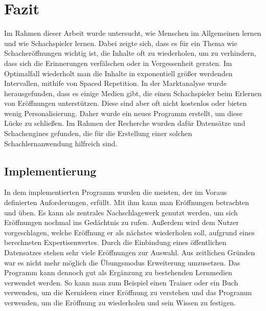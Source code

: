 
\chapter{Fazit}
Im Rahmen dieser Arbeit wurde untersucht, wie Menschen im Allgemeinen lernen und wie Schachspieler lernen. Dabei zeigte sich, dass es für ein Thema wie Schacheröffnungen wichtig ist, die Inhalte oft zu wiederholen, um zu verhindern, dass sich die Erinnerungen verfälschen oder in Vergessenheit geraten. Im Optimalfall wiederholt man die Inhalte in exponentiell größer werdenden Intervallen, mithife von Spaced Repetition. In der Marktanalyse wurde herausgefunden, dass es einige Medien gibt, die einen Schachspieler beim Erlernen von Eröffnungen unterstützen. Diese sind aber oft nicht kostenlos oder bieten wenig Personalisierung. Daher wurde ein neues Programm erstellt, um diese Lücke zu schließen. Im Rahmen der Recherche wurden dafür Datensätze und Schachengines gefunden, die für die Erstellung einer solchen Schachlernanwendung hilfreich sind.

\section{Implementierung}
In dem implementierten Programm wurden die meisten, der im Voraus definierten Anforderungen, erfüllt. Mit ihm kann man Eröffnungen betrachten und üben. Es kann als zentrales Nachschlagewerk genutzt werden, um sich Eröffnungen nochmal ins Gedächtnis zu rufen. Außerdem wird dem Nutzer vorgeschlagen, welche Eröffnung er als nächstes wiederholen soll, aufgrund eines berechneten Expertisenwertes. Durch die Einbindung eines öffentlichen Datensatzes stehen sehr viele Eröffnungen zur Auswahl. Aus zeitlichen Gründen war es nicht mehr möglich die Übungsmodus Erweiterung umzusetzen. Das Programm kann dennoch gut als Ergänzung zu bestehenden Lernmedien verwendet werden. So kann man zum Beispiel einen Trainer oder ein Buch verwenden, um die Kernideen einer Eröffnung zu verstehen und das Programm verwenden, um die Eröffnung zu wiederholen und sein Wissen zu festigen.

